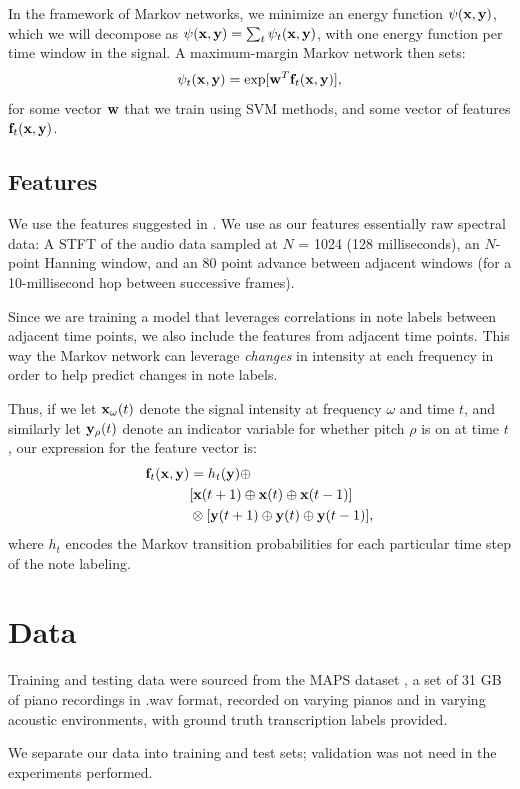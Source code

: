 \documentclass{article}
\begin{document}
In the framework of Markov networks, we minimize
an energy function $\psi(\mathbf{x},\mathbf{y})$, which we will decompose as
$\psi(\mathbf{x},\mathbf{y}) = \sum_t \psi_t(\mathbf{x},\mathbf{y})$, with one energy function per time window
in the signal. A maximum-margin Markov network then sets:
\[ \psi_t(\mathbf{x},\mathbf{y}) = \exp[\mathbf{w}^T\mathbf{f}_t(\mathbf{x},\mathbf{y})], \]
for some vector $\mathbf{w}$ that we train using SVM methods, and some vector of
features $\mathbf{f}_t(\mathbf{x},\mathbf{y})$.

\subsection{Features}
We use the features suggested in \cite{poliner2006discriminative}.
We use as our features essentially raw spectral data:
A STFT of the audio data sampled at $N$ = 1024 (128 milliseconds), an $N$-point Hanning window, and an 80 point advance between adjacent windows (for a 10-millisecond hop between successive frames).

Since we are training a model that leverages correlations in note labels
between adjacent time points, we also include the features from adjacent
time points. This way the Markov network can leverage \emph{changes} in
intensity at each frequency in order to help predict changes in note labels.

Thus, if we let $\mathbf{x}_{\omega}(t)$ denote the signal intensity at frequency
$\omega$ and time $t$, and similarly let $\mathbf{y}_{\rho}(t)$ denote an indicator
variable for whether pitch $\rho$ is on at time $t$, our expression for the
feature vector is:
\begin{align*}
  \mathbf{f}_t(\mathbf{x},\mathbf{y}) &= h_t(\mathbf{y}) \oplus
      \\& [\mathbf{x}(t+1) \oplus \mathbf{x}(t) \oplus \mathbf{x}(t-1)]
      \\&\otimes [\mathbf{y}(t+1) \oplus \mathbf{y}(t) \oplus \mathbf{y}(t-1)],
\end{align*}
where $h_t$ encodes the Markov transition probabilities for each particular
time step of the note labeling.

\section{Data}
Training and testing data were sourced from the MAPS dataset 
\cite{emiya2010multipitch}, a set of 31 GB of piano recordings in .wav format,
recorded on varying pianos and in varying acoustic environments, with ground
truth transcription labels provided.

We separate our data into training and test sets; validation was not need in the experiments performed.
\end{document}
